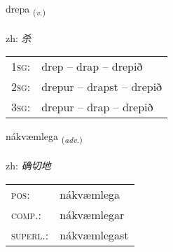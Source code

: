 \documentclass[frontgrid, backgrid]{flacards}\usepackage[]{graphicx}\usepackage[]{color}
\begin{document}
\renewcommand{\flhead}{\vskip5pt \fboxsep=0pt {\small\bfseries\footnotesize Sagnorð | 动词}}
\renewcommand{\fcfoot}{\vskip5pt \fboxsep=0pt \hspace{2pt}{\small\bfseries\footnotesize 2K}}

\renewcommand{\blhead}{\vskip5pt {\small\bfseries\footnotesize Sagnorð | 动词 }}
\renewcommand{\bcfoot}{\vskip5pt \hspace{2pt}{\small\bfseries\footnotesize 2K}}


{drepa \small{\textsubscript{(\textit{v.})}} \\[1ex] %
\textphonetic{[trɛːpa]} \\
zh: \emph{杀} \\  [2ex]
\renewcommand*{\arraystretch}{0.8}
\begin{tabular}{p{1cm}l}
\textsc{1sg}: & drep -- drap -- drepið \\ 
\textsc{2sg}: & drepur -- drapst -- drepið \\ 
\textsc{3sg}: & drepur -- drap -- drepið \\ 
\end{tabular}
}

\renewcommand{\flhead}{\vskip5pt \fboxsep=0pt {\small\bfseries\footnotesize Atviksorð | 副词}}
\renewcommand{\fcfoot}{\vskip5pt \fboxsep=0pt \hspace{2pt}{\small\bfseries\footnotesize 2K}}

\renewcommand{\blhead}{\vskip5pt {\small\bfseries\footnotesize Atviksorð | 副词 }}
\renewcommand{\bcfoot}{\vskip5pt \hspace{2pt}{\small\bfseries\footnotesize 2K}}


{nákvæmlega \small{\textsubscript{(\textit{adv.})}} \\[1ex] %
\textphonetic{[nauːkʰvaimlɛɣa]} \\
zh: \emph{确切地} \\  [2ex]
\renewcommand*{\arraystretch}{0.8}
\begin{tabular}{ll}
\textsc{pos}: & nákvæmlega \\ 
\textsc{comp.}: & nákvæmlegar \\ 
\textsc{superl.}: & nákvæmlegast \\
\end{tabular}
}
\end{document}
